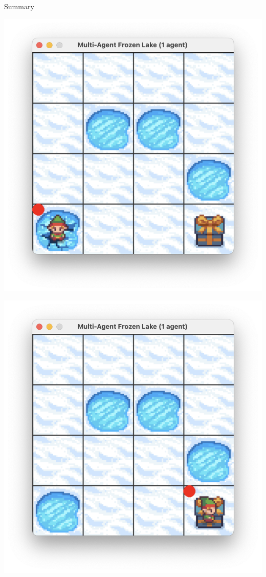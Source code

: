 \documentclass[aspectratio=169,xcolor=dvipsnames]{beamer}
\begin{document}
\begin{frame}{Summary}
\begin{minipage}{0.1\textwidth}
\begin{minipage}{\textwidth}
        \includegraphics[scale=0.15]{images/fallen-agent.png}
    \end{minipage}
    \vspace{-15pt}
    \vfill
    \begin{minipage}{\textwidth}
        \centering
        \includegraphics[scale=0.15]{images/goal-agent.png}
    \end{minipage}
\end{minipage}

\end{frame}
\end{document}
